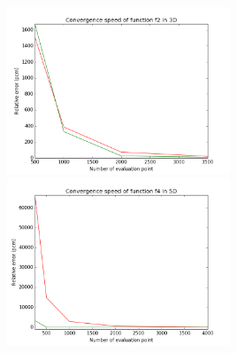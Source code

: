 \begin{center}
\begin{figure}[!h]
\begin{subfigure}[b]{0.3\textwidth}
		\end{subfigure}
		~
		\begin{subfigure}[b]{0.3\textwidth}
				\includegraphics[width=\linewidth,height=5cm]{images/f2_3d.png}
				\includegraphics[width=\linewidth,height=5cm]{images/f4_5d.png}
		\end{subfigure}
		\label{figure:precision}
\end{figure}


\end{center}
